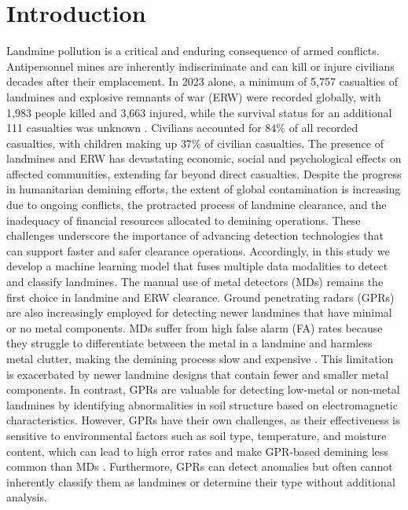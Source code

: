 \documentclass{ieeeaccess}
\begin{document}
\section{Introduction}
\label{sec:introduction}
Landmine pollution is a critical and enduring consequence of armed conflicts. Antipersonnel mines are inherently indiscriminate and can kill or injure civilians decades after their emplacement. In 2023 alone, a minimum of 5,757 casualties of landmines and explosive remnants of war (ERW) were recorded globally, with 1,983 people killed and 3,663 injured, while the survival status for an additional 111 casualties was unknown \cite{ICBL-CMC2024}. Civilians accounted for $84\%$ of all recorded casualties, with children making up $37\%$ of civilian casualties. The presence of landmines and ERW has devastating economic, social and psychological effects on affected communities, extending far beyond direct casualties. Despite the progress in humanitarian demining efforts, the extent of global contamination is increasing due to ongoing conflicts, the protracted process of landmine clearance, and the inadequacy of financial resources allocated to demining operations. These challenges underscore the importance of advancing detection technologies that can support faster and safer clearance operations. Accordingly, in this study we develop a machine learning model that fuses multiple data modalities to detect and classify landmines. 
The manual use of metal detectors (MDs) remains the first choice in landmine and ERW clearance. Ground penetrating radars (GPRs) are also increasingly employed for detecting newer landmines that have minimal or no metal components. MDs suffer from high false alarm (FA) rates because they struggle to differentiate between the metal in a landmine and harmless metal clutter, making the demining process slow and expensive \cite{Evans2024}. This limitation is exacerbated by newer landmine designs that contain fewer and smaller metal components. In contrast, GPRs are valuable for detecting low-metal or non-metal landmines by identifying abnormalities in soil structure based on electromagnetic characteristics. However, GPRs have their own challenges, as their effectiveness is sensitive to environmental factors such as soil type, temperature, and moisture content, which can lead to high error rates and make GPR-based demining less common than MDs \cite{Evans2024}. Furthermore, GPRs can detect anomalies but often cannot inherently classify them as landmines or determine their type without additional analysis.
\end{document}
